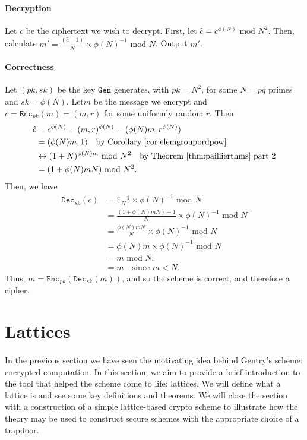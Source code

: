 \documentclass{article}
\theoremstyle{definition}
\newcommand{\Enc}{\texttt{Enc}}
\newcommand{\Dec}{\texttt{Dec}}
\newcommand{\Gen}{\texttt{Gen}}
\renewcommand{\mod}{\,\,\text{mod}\,\,}
\begin{document}
\paragraph{Decryption} 
Let $c$ be the ciphertext we wish to decrypt. First, let $\hat{c} = c^{\phi(N)}
\mod N^2$. Then, calculate $m' = \frac{(\hat{c} - 1)}{N} \times \phi(N)^{-1} \mod N$.
Output $m'$.
\paragraph{Correctness}
Let $(pk, sk)$ be the key $\Gen$ generates, with $pk = N^2$, for some $N = pq$
primes and $sk = \phi(N)$. Let$m$ be the message we encrypt and $c =
\Enc_{pk}(m) =(m, r)$ for some uniformly random $r$. Then
\begin{align*}
  \hat{c} &= c^{\phi(N)} = (m, r)^{\phi(N)} = (\phi(N)m, r^{\phi(N)}) \\
          &= (\phi(N)m, 1) \quad \text{by Corollary \ref{cor:elemgroupordpow}}\\
          &\leftrightarrow (1 + N)^{\phi(N)m} \mod N^2 \quad \text{by Theorem \ref{thm:paillierthms} part 2}\\
          &= (1 + \phi(N)mN) \mod N^2.
\end{align*}
Then, we have
\begin{align*}
  \Dec_{sk}(c) &= \frac{\hat{c} - 1}{N} \times \phi(N)^{-1} \mod N\\
               &= \frac{(1 + \phi(N)mN) - 1}{N} \times \phi(N)^{-1} \mod N\\
               &= \frac{\phi(N)mN}{N}\times \phi(N)^{-1} \mod N\\
               &= \phi(N)m \times \phi(N)^{-1} \mod N \\
               &= m \mod N. \\
               &= m \quad \text{since } m < N.
\end{align*}
Thus, $m = \Enc_{pk}(\Dec_{sk}(m))$, and so the scheme is correct, and therefore
a cipher.
\section{Lattices}
\paragraph{}
In the previous section we have seen the motivating idea behind Gentry's scheme:
encrypted computation. In this section, we aim to provide a brief introduction
to the tool that helped the scheme come to life: lattices. We will define what a
lattice is and see some key definitions and theorems. We will close the section
with a construction of a simple lattice-based crypto scheme to illustrate how
the theory may be used to construct secure schemes with the appropriate choice
of a trapdoor.
\end{document}
